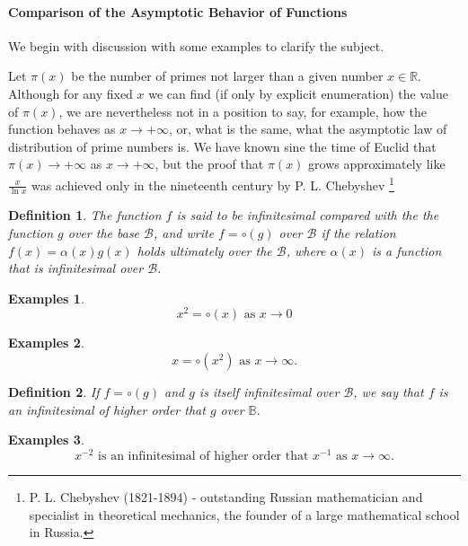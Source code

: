 \documentclass[a4paper,12pt]{article} %
\newtheorem{definition}{Definition}[section]
\newtheorem{example}{Examples}
\begin{document}
\paragraph{{\rm \textbf{Comparison of the Asymptotic Behavior of Functions}}}
We begin with discussion with some examples to clarify the subject.

Let $\pi(x)$ be the number of primes not larger than a given number $x\in\mathbb{R}$.
Although for any fixed $x$ we can find (if only by explicit enumeration) the 
value of $\pi(x)$, we are nevertheless not in a position to say, for example, 
how the function behaves as $x \to +\infty$, or, what is the same, what the asymptotic 
law of distribution of prime numbers is. We have known sine the time of Euclid
that $\pi(x) \to +\infty$ as $x \to +\infty$, but the proof that $\pi(x)$ grows approximately like 
$\frac{x}{\ln x} $ was achieved only in the nineteenth century by P. L. Chebyshev 
\footnote{P. L. Chebyshev (1821-1894) - outstanding Russian mathematician 
and specialist in theoretical mechanics, the founder of a large mathematical 
school in Russia.}

\begin{definition}
    The function $f$ is said to be infinitesimal compared with the 
    the function $g$ over the base $\mathcal{B}$, and write $f = \circ(g)$
    over $\mathcal{B}$ if the relation $f(x) = \alpha(x)g(x)$ holds ultimately 
    over the $\mathcal{B}$, where $\alpha(x)$ is a function that is infinitesimal 
    over $\mathcal{B}$.
\end{definition}

\begin{example}
    \[
        x^2 = \circ(x) \text{ as } x \to 0
        \]
\end{example}

\begin{example}
    \[
        x = \circ(x^2) \text{ as } x \to \infty.
        \]
\end{example}

\begin{definition}
    If $f = \circ(g)$ and $g$ is itself infinitesimal over $\mathcal{B}$, we say 
    that $f$ is an infinitesimal of higher order that $g$ over $\mathbb{B}$.
\end{definition}
\begin{example}
    \[
        x^{-2} \text{ is an infinitesimal of higher order that } x^{-1} \text { as }
        x \to \infty.
        \]
\end{example}
\end{document}
